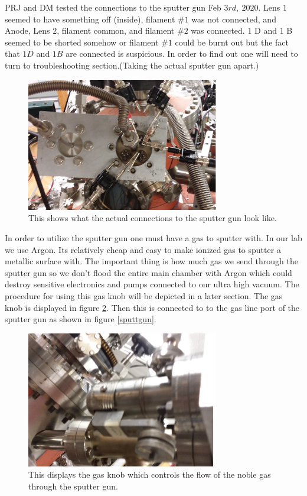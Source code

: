 \documentclass[11pt,a4paper]{report}
\begin{document}
PRJ and DM tested the connections to the sputter gun Feb $3rd, \ 2020$. Lens $1$ seemed to have something off (inside), filament $\# 1$ was not connected, and Anode, Lens $2$, filament common, and filament $\# 2$ was connected. $1$ D and $1$ B seemed to be shorted somehow or filament $\# 1$ could be burnt out but the fact that $1 D$ and $1 B$ are connected is suspicious. In order to find out one will need to turn to troubleshooting section.(Taking the actual sputter gun apart.)


\begin{figure}[H]
\includegraphics[width=0.75\textwidth]{real_gun_connections.png}
\caption{This shows what the actual connections to the sputter gun look like. }
\label{realgun}
\end{figure}


In order to utilize the sputter gun one must have a gas to sputter with. In our lab we use Argon. Its relatively cheap and easy to make ionized gas to sputter a metallic surface with. The important thing is how much gas we send through the sputter gun so we don't flood the entire main chamber with Argon which could destroy sensitive electronics and pumps connected to our ultra high vacuum. The procedure for using this gas knob will be depicted in a later section. The gas knob is displayed in figure  \ref{gasknob}. Then this is connected to to the gas line port of the sputter gun as shown in figure \ref{sputtgun}.

\begin{figure}[H]
\includegraphics[width=0.75\textwidth]{gas_knob.png}
\caption{This displays the gas knob which controls the flow of the noble gas through the sputter gun. }
\label{gasknob}
\end{figure}
\end{document}
